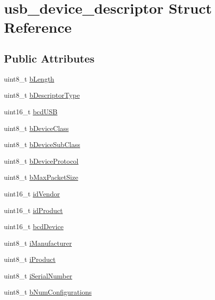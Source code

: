 \hypertarget{structusb__device__descriptor}{}\section{usb\+\_\+device\+\_\+descriptor Struct Reference}
\label{structusb__device__descriptor}
\subsection*{Public Attributes}
\begin{DoxyCompactItemize}
\item 
uint8\+\_\+t \hyperlink{structusb__device__descriptor_af3f980ad55af3fd6c222a8802996ab63}{b\+Length}
\item 
uint8\+\_\+t \hyperlink{structusb__device__descriptor_ad1ba08da6ad5b6023f1d0d1461daab7d}{b\+Descriptor\+Type}
\item 
uint16\+\_\+t \hyperlink{structusb__device__descriptor_aa400edb6c3183d4922411cdaf980b84e}{bcd\+U\+SB}
\item 
uint8\+\_\+t \hyperlink{structusb__device__descriptor_aa657267e1d9762b7d2ed3eb60a78d9ad}{b\+Device\+Class}
\item 
uint8\+\_\+t \hyperlink{structusb__device__descriptor_aecfbe730bc3eeccc9c4b5fd17f5f3c3c}{b\+Device\+Sub\+Class}
\item 
uint8\+\_\+t \hyperlink{structusb__device__descriptor_a56829af76e57a6ea4fc621b52a0664f8}{b\+Device\+Protocol}
\item 
uint8\+\_\+t \hyperlink{structusb__device__descriptor_af4ea427f5567e12e319297535e54e192}{b\+Max\+Packet\+Size}
\item 
uint16\+\_\+t \hyperlink{structusb__device__descriptor_a043126e48bebbab536540e44428b6b4f}{id\+Vendor}
\item 
uint16\+\_\+t \hyperlink{structusb__device__descriptor_a70d5ecc7bad486b8a8840d86aa151579}{id\+Product}
\item 
uint16\+\_\+t \hyperlink{structusb__device__descriptor_a41416aa4a49999d2f3f0f67bdc5fa7da}{bcd\+Device}
\item 
uint8\+\_\+t \hyperlink{structusb__device__descriptor_ad082330020575944b8471459b816cb40}{i\+Manufacturer}
\item 
uint8\+\_\+t \hyperlink{structusb__device__descriptor_acb90b91c59e65adbcc21949cf0f486f7}{i\+Product}
\item 
uint8\+\_\+t \hyperlink{structusb__device__descriptor_a105d91b68091e61c9b13ea673fb98eaf}{i\+Serial\+Number}
\item 
uint8\+\_\+t \hyperlink{structusb__device__descriptor_a603204b0517e9ece9bc0d8476b2a7cdc}{b\+Num\+Configurations}
\end{DoxyCompactItemize}


